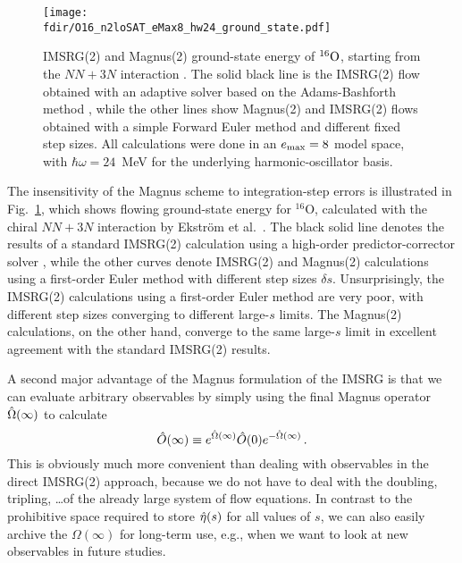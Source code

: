 {\begin{figure}[t]
  \begin{center}
    \texttt{[image: \\fdir/O16\_n2loSAT\_eMax8\_hw24\_ground\_state.pdf]}
  \end{center}
  \caption{\label{fig:timestep_O16}
    IMSRG(2) and Magnus(2) ground-state energy of $\nuc{O}{16}$, 
    starting from the \NNLOsat{} $NN+3N$ interaction \cite{Ekstrom:2015fk}. The 
    solid black line is the IMSRG(2) flow obtained with
    an adaptive solver based on the Adams-Bashforth method \cite{Radhakrishnan:1993fk}, 
    while the other lines show Magnus(2) and IMSRG(2) flows 
    obtained with a simple Forward Euler method and different 
    fixed step sizes. All calculations were done in an
    $\eMax=8$ model space, with $\hbar\omega = 24$~MeV for the
    underlying harmonic-oscillator basis.}
\end{figure}

The insensitivity of the Magnus scheme to integration-step errors is illustrated 
in Fig.~\ref{fig:timestep_O16}, which shows flowing ground-state energy for 
$^{16}$O, calculated with the chiral \NNLOsat{} $NN+3N$ 
interaction by Ekstr\"{o}m et al.~\cite{Ekstrom:2015fk}. The black solid line 
denotes the results of a standard IMSRG(2) calculation using a high-order 
predictor-corrector solver \cite{Hindmarsh:1983pd,Hindmarsh:2005kl}, while the 
other curves denote IMSRG(2) and Magnus(2) calculations using a first-order Euler 
method with different step sizes $\delta s$. Unsurprisingly, the IMSRG(2) calculations 
using a first-order Euler method are very poor, with different step sizes
converging to different large-$s$ limits. The Magnus(2) calculations,
on the other hand, converge to the same large-$s$ limit in excellent
agreement with the standard IMSRG(2) results.

A second major advantage of the Magnus formulation of the IMSRG is that
we can evaluate arbitrary observables by simply using the final 
Magnus operator $\OmegaO(\infty)$ to calculate
\begin{equation}
  \OO(\infty)\equiv e^{\OmegaO(\infty)}\OO(0) e^{-\OmegaO(\infty)}\,.
\end{equation}
This is obviously much more convenient than dealing with observables
in the direct IMSRG(2) approach, because we do not have to deal with
the doubling, tripling, \ldots of the already large system of flow
equations. In contrast to the prohibitive space required to store 
$\etaO(s)$ for all values of $s$, we can also easily archive the 
$\Omega(\infty)$ for long-term use, e.g., when we want to look at
new observables in future studies. 

}
